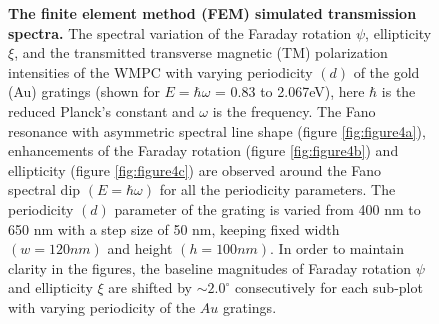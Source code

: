 \documentclass[13pt]{article}
\begin{document}
\begin{figure}[hbt!]
\begin{subfigure}[]{.49\linewidth}
		\caption{}
		\label{fig:figure4d}
	\end{subfigure}
	\caption{\textbf{The finite element method (FEM) simulated transmission spectra.} The spectral variation of the Faraday rotation $\psi$, ellipticity $\xi$, and the transmitted transverse magnetic (TM) polarization intensities of the WMPC with varying periodicity $(d)$ of the gold (Au) gratings (shown for $E=\hbar \omega$ = 0.83 to 2.067eV), here $\hbar$ is the reduced Planck’s constant and $\omega$ is the frequency. The Fano resonance with asymmetric spectral line shape (figure \ref{fig:figure4a}), enhancements of the Faraday rotation  (figure \ref{fig:figure4b}) and ellipticity (figure \ref{fig:figure4c}) are observed around the Fano spectral dip $(E=\hbar \omega)$ for all the periodicity parameters. The periodicity $(d)$ parameter of the grating is varied from 400 nm to 650 nm with a step size of 50 nm, keeping fixed width $(w = 120 nm)$ and height $(h = 100 nm)$. In order to maintain clarity in the figures, the baseline magnitudes of Faraday rotation $\psi$ and ellipticity $\xi$ are shifted by $ \sim 2.0^{\circ}$ consecutively for each sub-plot with varying periodicity of the $Au$ gratings.}
	\label{fig:figure4}
\end{figure}

\FloatBarrier
\end{document}
